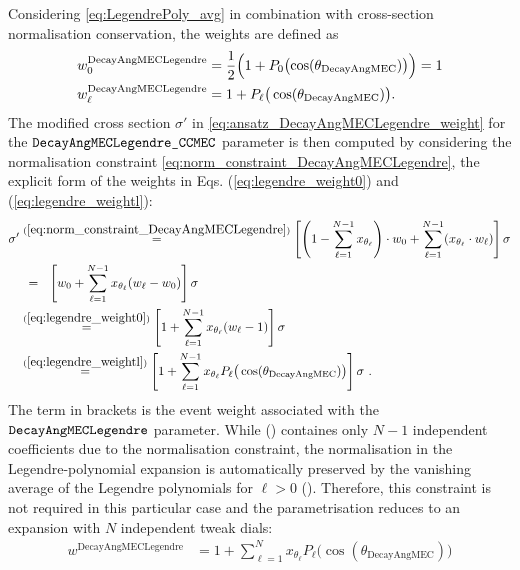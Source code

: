 Considering \cref{eq:LegendrePoly_avg} in combination with cross-section normalisation conservation, the weights are defined as
%
\begin{align}
    w_0^\text{DecayAngMECLegendre} &=  \frac{1}{2} \Bigl( 1 + P_0\bigl(\cos(\theta_\text{DecayAngMEC})\bigr) \Bigr) = 1 \label{eq:legendre_weight0} \\
    w_\ell^\text{DecayAngMECLegendre} &= 1 + P_\ell\big(\cos(\theta_\text{DecayAngMEC})\big) \text{.} \label{eq:legendre_weightl} 
\end{align}
%
The modified cross section $\sigma'$ in \cref{eq:ansatz_DecayAngMECLegendre_weight} for the $\verb!DecayAngMECLegendre_CCMEC!$ parameter is then computed by considering the normalisation constraint  \cref{eq:norm_constraint_DecayAngMECLegendre}, the explicit form of the weights in Eqs. (\ref{eq:legendre_weight0}) and (\ref{eq:legendre_weightl}):
%
\begin{align} \label{eq:calc_DecayAngMECLegendre_weight}
    \sigma'
    &\overset{(\ref{eq:norm_constraint_DecayAngMECLegendre})}{=} 
    \left[ \left( 1 - \sum^{N-1}_{\ell=1} x_{\theta_\ell} \right) \cdot w_0 +  \sum^{N-1}_{\ell=1} (x_{\theta_\ell} \cdot w_\ell) \right] \sigma \\
    &\hspace{1ex}=\hspace{1.5ex}
    \left[ w_0 + \sum^{N-1}_{\ell=1} x_{\theta_\ell} (w_\ell - w_0) \right] \sigma \\
    &\overset{(\ref{eq:legendre_weight0})}{=}
    \left[ 1 + \sum^{N-1}_{\ell=1} x_{\theta_\ell} (w_\ell - 1) \right] \sigma \\
    &\overset{(\ref{eq:legendre_weightl})}{=} 
    \left[ 1 + \sum^{N-1}_{\ell=1} x_{\theta_\ell} P_\ell\big(\cos(\theta_\text{DecayAngMEC})\big) \right] \sigma \label{eq:xsec_weight_constrained}
    \ \text{.}
\end{align}
%
The term in brackets is the event weight associated with the $\verb!DecayAngMECLegendre!$ parameter. While () containes only $N-1$ independent coefficients due to the normalisation constraint, the normalisation in the Legendre-polynomial expansion is automatically preserved by the vanishing average of the Legendre polynomials for $\ell >0$ (). Therefore, this constraint is not required in this particular case and the parametrisation reduces to an expansion with $N$ independent tweak dials:
%
\begin{align} \label{eq:DecayAngMECLegendre_weight}
    w^\text{DecayAngMECLegendre}
    &=
    1 + \sum^{N}_{\ell=1} x_{\theta_\ell} P_\ell\big(\cos(\theta_\text{DecayAngMEC})\big)
\end{align}
